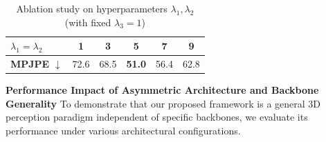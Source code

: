 \documentclass[journal]{IEEEtran}
\begin{document}
\begin{table}[ht]
\centering
\caption{Ablation study on hyperparameters $\lambda_{1}, \lambda_{2}$ (with fixed $\lambda_{3} = 1$)}
\renewcommand{\arraystretch}{1.1}
\small
\label{tab:ablation_lambda12}
\renewcommand{\arraystretch}{1.2}
\setlength{\tabcolsep}{8pt}
\begin{tabular}{l|ccccc}
\hline
$\lambda_{1}=\lambda_{2}$ & 1 & 3 & 5 & 7 & 9 \\ \hline
\textbf{MPJPE} $\downarrow$ & 72.6 & 68.5 & \textbf{51.0} & 56.4 & 62.8 \\ \hline
\end{tabular}
\end{table}

\textbf{Performance Impact of Asymmetric Architecture and Backbone Generality} To demonstrate that our proposed framework is a general 3D perception paradigm independent of specific backbones, we evaluate its performance under various architectural configurations.
\end{document}

